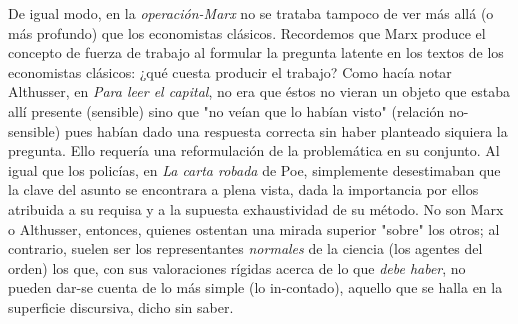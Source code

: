 De igual modo, en la \emph{operación-Marx} no se trataba tampoco de ver
más allá (o más profundo) que los economistas clásicos. Recordemos que
Marx produce el concepto de fuerza de trabajo al formular la pregunta
latente en los textos de los economistas clásicos: ¿qué cuesta producir
el trabajo? Como hacía notar Althusser, en \emph{Para leer el capital},
no era que éstos no vieran un objeto que estaba allí presente (sensible)
sino que "no veían que lo habían visto" (relación no-sensible) pues
habían dado una respuesta correcta sin haber planteado siquiera la
pregunta. Ello requería una reformulación de la problemática en su
conjunto. Al igual que los policías, en \emph{La carta robada} de Poe,
simplemente desestimaban que la clave del asunto se encontrara a plena
vista, dada la importancia por ellos atribuida a su requisa y a la
supuesta exhaustividad de su método. No son Marx o Althusser, entonces,
quienes ostentan una mirada superior "sobre" los otros; al contrario,
suelen ser los representantes \emph{normales} de la ciencia (los agentes
del orden) los que, con sus valoraciones rígidas acerca de lo que
\emph{debe haber}, no pueden dar-se cuenta de lo más simple (lo
in-contado), aquello que se halla en la superficie discursiva, dicho sin
saber.

